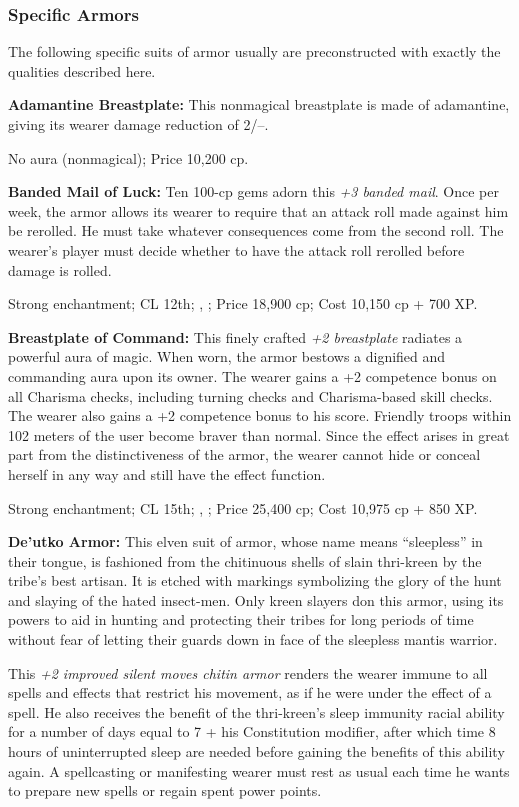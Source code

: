 \subsubsection{Specific Armors}
The following specific suits of armor usually are preconstructed with exactly the qualities described here.

\textbf{Adamantine Breastplate:} This nonmagical breastplate is made of adamantine, giving its wearer damage reduction of 2/--.

No aura (nonmagical); Price 10,200 cp.

\textbf{Banded Mail of Luck:} Ten 100-cp gems adorn this \emph{+3 banded mail}. Once per week, the armor allows its wearer to require that an attack roll made against him be rerolled. He must take whatever consequences come from the second roll. The wearer's player must decide whether to have the attack roll rerolled before damage is rolled.

Strong enchantment; CL 12th; , ; Price 18,900 cp; Cost 10,150 cp + 700 XP.

\textbf{Breastplate of Command:} This finely crafted \emph{+2 breastplate} radiates a powerful aura of magic. When worn, the armor bestows a dignified and commanding aura upon its owner. The wearer gains a +2 competence bonus on all Charisma checks, including turning checks and Charisma-based skill checks. The wearer also gains a +2 competence bonus to his  score. Friendly troops within 102 meters of the user become braver than normal. Since the effect arises in great part from the distinctiveness of the armor, the wearer cannot hide or conceal herself in any way and still have the effect function.

Strong enchantment; CL 15th; , ; Price 25,400 cp; Cost 10,975 cp + 850 XP.

\textbf{De'utko Armor:} This elven suit of armor, whose name means ``sleepless'' in their tongue, is fashioned from the chitinuous shells of slain thri-kreen by the tribe's best artisan. It is etched with markings symbolizing the glory of the hunt and slaying of the hated insect-men. Only kreen slayers don this armor, using its powers to aid in hunting and protecting their tribes for long periods of time without fear of letting their guards down in face of the sleepless mantis warrior.

This \emph{+2 improved silent moves chitin armor} renders the wearer immune to all spells and effects that restrict his movement, as if he were under the effect of a  spell. He also receives the benefit of the thri-kreen's sleep immunity racial ability for a number of days equal to 7 + his Constitution modifier, after which time 8 hours of uninterrupted sleep are needed before gaining the benefits of this ability again. A spellcasting or manifesting wearer must rest as usual each time he wants to prepare new spells or regain spent power points.

